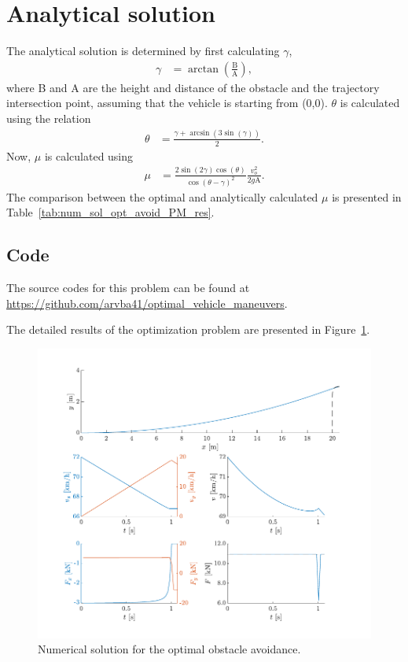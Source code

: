 \section{Analytical solution}
The analytical solution is determined by first calculating $\gamma$, 
\begin{align}
    \gamma &= \arctan\left(\frac{\text{B}}{\text{A}}\right),
\end{align}
where B and A are the height and distance of the obstacle and the trajectory intersection point, assuming that the vehicle is starting from (0,0). 
$\theta$ is calculated using the relation
\begin{align}
    \theta &= \frac{\gamma + \arcsin\left(3\sin\left(\gamma\right)\right)}{2}.
\end{align}
Now, $\mu$ is calculated using 
\begin{align}
    \mu &= \frac{2\sin\left(2\gamma\right)\cos\left(\theta\right)}{\cos\left(\theta-\gamma\right)^2}\frac{v_o^2}{2g\text{A}}.
\end{align}
The comparison between the optimal and analytically calculated $\mu$ is presented in Table~\ref{tab:num_sol_opt_avoid_PM_res}.

\subsection{Code}
The source codes for this problem can be found at \newline \href{https://github.com/arvba41/optimal_vehicle_maneuvers/blob/main/uppgift/ugf4/opti_veh_men_prt.m}{https://github.com/arvba41/optimal\_vehicle\_maneuvers}.

The detailed results of the optimization problem are presented in Figure~\ref{fig:num_sol_opt_avoid_PM_res_pic}.
\begin{figure}[h!]
    \centering
    \includegraphics{figures/prob4_opt_avoid_path.pdf}
    \caption{Numerical solution for the optimal obstacle avoidance.}
    \label{fig:num_sol_opt_avoid_PM_res_pic}
\end{figure}
